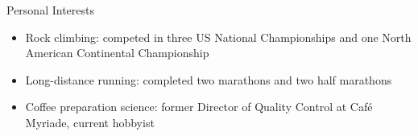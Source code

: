 \documentclass{resume} %
\begin{document}

\begin{rSection}{Personal Interests}

\begin{itemize}
			\renewcommand\labelitemi{$\cdot$} 
	\item Rock climbing: competed in three US National Championships and one North American Continental Championship
	\item Long-distance running: completed two marathons and two half marathons
	\item Coffee preparation science: former Director of Quality Control at Caf\'e Myriade, current hobbyist
\end{itemize}

\end{rSection}






\end{document}
